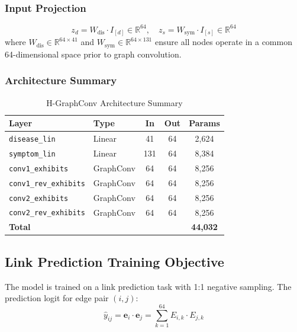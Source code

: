 \documentclass[conference]{IEEEtran}
\begin{document}
\subsubsection{Input Projection}
\begin{equation}
  z_d = W_{\mathrm{dis}}\cdot I_{[d]}\in\mathbb{R}^{64}, \quad
  z_s = W_{\mathrm{sym}}\cdot I_{[s]}\in\mathbb{R}^{64}
  \label{eq:projection}
\end{equation}
where $W_{\mathrm{dis}}\in\mathbb{R}^{64\times41}$ and
$W_{\mathrm{sym}}\in\mathbb{R}^{64\times131}$ ensure all nodes
operate in a common 64-dimensional space prior to graph convolution.

\subsubsection{Architecture Summary}

\begin{table}[htbp]
  \centering
  \caption{H-GraphConv Architecture Summary}
  \label{tab:architecture}
  \renewcommand{\arraystretch}{1.25}
  \setlength{\tabcolsep}{4pt}
  \begin{tabular}{llccc}
    \toprule
    \textbf{Layer} & \textbf{Type} & \textbf{In} &
      \textbf{Out} & \textbf{Params} \\
    \midrule
    \texttt{disease\_lin}         & Linear    & 41  & 64 & 2,624 \\
    \texttt{symptom\_lin}         & Linear    & 131 & 64 & 8,384 \\
    \texttt{conv1\_exhibits}      & GraphConv & 64  & 64 & 8,256 \\
    \texttt{conv1\_rev\_exhibits} & GraphConv & 64  & 64 & 8,256 \\
    \texttt{conv2\_exhibits}      & GraphConv & 64  & 64 & 8,256 \\
    \texttt{conv2\_rev\_exhibits} & GraphConv & 64  & 64 & 8,256 \\
    \midrule
    \textbf{Total} & & & & \textbf{44,032} \\
    \bottomrule
  \end{tabular}
\end{table}

\subsection{Link Prediction Training Objective}

The model is trained on a link prediction task with 1:1 negative
sampling. The prediction logit for edge pair $(i,j)$:
\begin{equation}
  \hat{y}_{ij} = \mathbf{e}_i\cdot\mathbf{e}_j
    = \sum_{k=1}^{64}E_{i,k}\cdot E_{j,k}
  \label{eq:dotproduct}
\end{equation}
\end{document}
